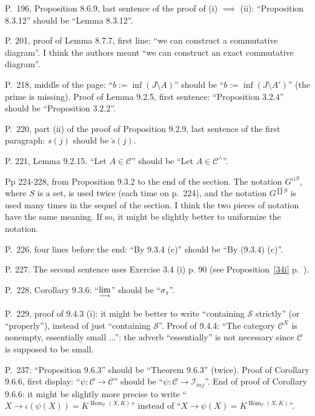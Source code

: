 \documentclass[12pt]{article}
\theoremstyle{remark}
\theoremstyle{definition}
\newcommand{\C}{\mathcal C}
\newcommand{\ilim}{\operatornamewithlimits{\underset{\longrightarrow}{lim}}}
\DeclareMathOperator{\Hom}{Hom}%
\begin{document}
\noindent P.~196, Proposition 8.6.9, last sentence of the proof of (i) $\implies$ (ii): ``Proposition 8.3.12'' should be ``Lemma 8.3.12''.


\noindent P. 201, proof of Lemma 8.7.7, first line: ``we can construct a commutative diagram''. I think the authors meant ``we can construct an exact commutative diagram''.

\noindent P.~218, middle of the page: ``$b:=\inf(J\setminus A)$'' should be ``$b:=\inf(J\setminus A')$'' (the prime is missing). Proof of Lemma 9.2.5, first sentence: ``Proposition 3.2.4'' should be ``Proposition 3.2.2''.

\noindent P.~220, part (ii) of the proof of Proposition 9.2.9, last sentence of the first paragraph: $s(j)$ should be $\tilde s(j)$.

\noindent P. 221, Lemma 9.2.15. ``Let $A\in\C$'' should be ``Let $A\in\C^\wedge$''.

\noindent Pp 224-228, from Proposition 9.3.2 to the end of the section. The notation $G^{\sqcup S}$, where $S$ is a set, is used twice (each time on p.~224), and the notation $G^{\coprod S}$ is used many times in the sequel of the section. I think the two pieces of notation have the same meaning. If so, it might be slightly better to uniformize the notation.

\noindent P.~226, four lines before the end: ``By 9.3.4 (c)'' should be ``By (9.3.4) (c)''.

\noindent P. 227. The second sentence uses Exercise 3.4 (i) p. 90 (see Proposition~\ref{34i} p.~\pageref{34i}).

\noindent P.~228, Corollary 9.3.6: ``$\ilim$'' should be ``$\sigma_\pi$''.

\noindent P.~229, proof of 9.4.3 (i): it might be better to write ``containing $\mathcal S$ strictly'' (or ``properly''), instead of just ``containing $\mathcal S$''. Proof of 9.4.4: ``The category $\C^X$ is nonempty, essentially small ...'': the adverb ``essentially'' is not necessary since $\C$ is supposed to be small.

\noindent P.~237: ``Proposition 9.6.3'' should be ``Theorem 9.6.3'' (twice). Proof of Corollary 9.6.6, first display: ``$\psi:\C\to\C$'' should be ``$\psi:\C\to\mathcal I_{inj}$''. %
End of proof of Corollary 9.6.6: it might be slightly more precise to write ``$X\to\iota(\psi(X))=K^{\Hom_\C(X,K)}$'' instead of ``$X\to\psi(X)=K^{\Hom_\C(X,K)}$''.
\end{document}
